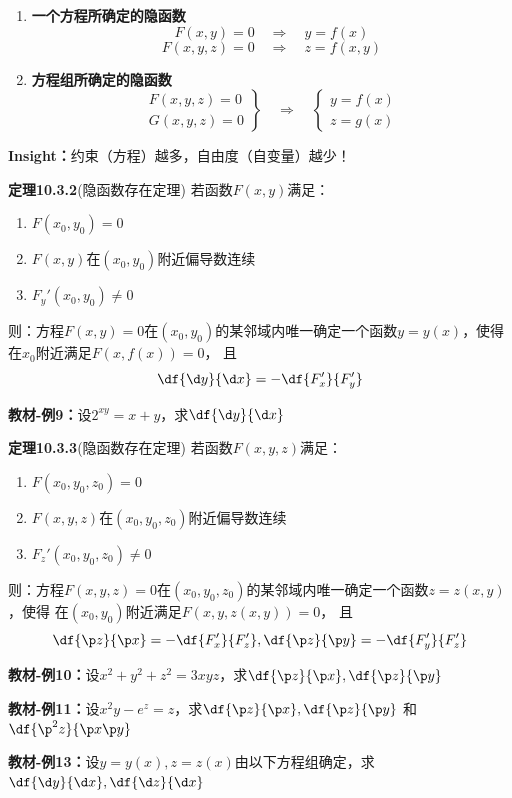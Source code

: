 \begin{enumerate}
  \setlength{\itemindent}{1cm}
  \item {\bf 一个方程所确定的隐函数} 
  $$F(x,y)=0 \quad \Rightarrow \quad y=f(x) $$
  $$F(x,y,z)=0 \quad \Rightarrow \quad z=f(x,y) $$
  \item {\bf 方程组所确定的隐函数} 
  $$\left.\begin{array}{l}
  	F(x,y,z)=0\\ G(x,y,z)=0
  \end{array}\right\} \quad \Rightarrow \quad 
  \left\{\begin{array}{l}
  	y=f(x)\\ z=g(x)
  \end{array}\right. $$
\end{enumerate}

{\bf Insight：}约束（方程）越多，自由度（自变量）越少！

{\bf 定理10.3.2}(隐函数存在定理)
若函数$F(x,y)$满足： 
\begin{enumerate}[(1)]
  \setlength{\itemindent}{1cm}
  \item $F(x_0,y_0)=0$ 
  \item $F(x,y)$在$(x_0,y_0)$附近偏导数连续 
  \item $F_y'(x_0,y_0)\ne 0$ 
\end{enumerate}
则：方程$F(x,y)=0$在$(x_0,y_0)$的某邻域内唯一确定一个函数$y=y(x)$，使得
在$x_0$附近满足$F(x,f(x))=0$， 且
$${\df{\d y}{\d x}=-\df{F'_x}{F'_y}}$$

{\bf 教材-例9：}设$2^{xy}=x+y$，求$\df{\d y}{\d x}$

{\bf 定理10.3.3}(隐函数存在定理)
若函数$F(x,y,z)$满足： 
\begin{enumerate}[(1)]
  \setlength{\itemindent}{1cm}
  \item $F(x_0,y_0,z_0)=0$ 
  \item $F(x,y,z)$在$(x_0,y_0,z_0)$附近偏导数连续 
  \item $F_z'(x_0,y_0,z_0)\ne 0$ 
\end{enumerate}
则：方程$F(x,y,z)=0$在$(x_0,y_0,z_0)$的某邻域内唯一确定一个函数$z=z(x,y)$，使得
在$(x_0,y_0)$附近满足$F(x,y,z(x,y))=0$， 且
$$\df{\p z}{\p x}=-\df{F'_x}{F'_z},\df{\p z}{\p y}=-\df{F'_y}{F'_z}$$

{\bf 教材-例10：}设$x^2+y^2+z^2=3xyz$，求$\df{\p z}{\p x},\df{\p z}{\p y}$

{\bf 教材-例11：}设$x^2y-e^z=z$，求$\df{\p z}{\p x},\df{\p z}{\p y}$
 和$\df{\p^2z}{\p x\p y}$
 
{\bf 教材-例13：}设$y=y(x),z=z(x)$由以下方程组确定，求$\df{\d y}{\d x},
 \df{\d z}{\d x}$

